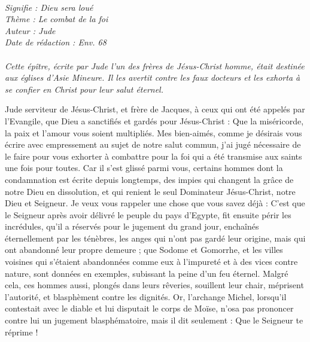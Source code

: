 \BFont
\noindent\hrulefill
{\footnotesize
\textit{
\bigskip
{\centering{}
\\Signifie : Dieu sera loué
\\Thème : Le combat de la foi
\\Auteur : Jude
\\Date de rédaction : Env. 68\\}
}
\textit{
\\Cette épître, écrite par Jude l’un des frères de Jésus-Christ homme, était destinée aux églises d’Asie Mineure. Il les avertit contre les faux docteurs et les exhorta à se confier en Christ pour leur salut éternel.\bigskip
}
}
\par\nobreak\noindent\hrulefill
\begin{multicols}{2}
\TextTitle{[Introduction]}
\VerseOne{}Jude serviteur de Jésus-Christ, et frère de Jacques, à ceux qui ont été appelés par l'Evangile, que Dieu a sanctifiés et gardés pour Jésus-Christ :
Que la miséricorde, la paix et l'amour vous soient multipliés.
Mes bien-aimés, comme je désirais vous écrire avec empressement au sujet de notre salut commun, j’ai jugé nécessaire de le faire pour vous exhorter à combattre pour la foi qui a été transmise aux saints une fois pour toutes.
Car il s’est glissé parmi vous, certains hommes dont la condamnation est écrite depuis longtemps, des impies qui changent la grâce de notre Dieu en dissolution, et qui renient le seul Dominateur Jésus-Christ, notre Dieu et Seigneur.
Je veux vous rappeler une chose que vous savez déjà : C'est que le Seigneur après avoir délivré le peuple du pays d'Egypte, fit ensuite périr les incrédules,
qu’il a réservés pour le jugement du grand jour, enchaînés éternellement par les ténèbres, les anges qui n'ont pas gardé leur origine, mais qui ont abandonné leur propre demeure ;
que Sodome et Gomorrhe, et les villes voisines qui s'étaient abandonnées comme eux à l'impureté et à des vices contre nature, sont données en exemples, subissant la peine d’un feu éternel.
Malgré cela, ces hommes aussi, plongés dans leurs rêveries, souillent leur chair, méprisent l’autorité, et blasphèment contre les dignités.
Or, l'archange Michel, lorsqu’il contestait avec le diable et lui disputait le corps de Moïse, n'osa pas prononcer contre lui un jugement blasphématoire, mais il dit seulement : Que le Seigneur te réprime !

\end{multicols}
